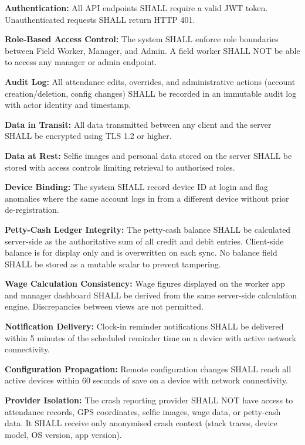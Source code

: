 \documentclass[12pt, a4paper]{article}
\begin{document}
\begin{description}[leftmargin=2.5cm, style=nextline]
    \item[NFR-09]
        \textbf{Authentication:} All API endpoints SHALL require a valid
        JWT token. Unauthenticated requests SHALL return HTTP 401.
    \item[NFR-10]
        \textbf{Role-Based Access Control:} The system SHALL enforce role
        boundaries between Field Worker, Manager, and Admin. A field
        worker SHALL NOT be able to access any manager or admin endpoint.
    \item[NFR-11]
        \textbf{Audit Log:} All attendance edits, overrides, and
        administrative actions (account creation/deletion, config changes)
        SHALL be recorded in an immutable audit log with actor identity
        and timestamp.
    \item[NFR-12]
        \textbf{Data in Transit:} All data transmitted between any client
        and the server SHALL be encrypted using TLS 1.2 or higher.
    \item[NFR-13]
        \textbf{Data at Rest:} Selfie images and personal data stored on
        the server SHALL be stored with access controls limiting retrieval
        to authorised roles.
    \item[NFR-14]
        \textbf{Device Binding:} The system SHALL record device ID at
        login and flag anomalies where the same account logs in from a
        different device without prior de-registration.
    \item[NFR-15]
        \textbf{Petty-Cash Ledger Integrity:} The petty-cash balance
        SHALL be calculated server-side as the authoritative sum of all
        credit and debit entries. Client-side balance is for display only
        and is overwritten on each sync. No balance field SHALL be stored
        as a mutable scalar to prevent tampering.
    \item[NFR-16]
        \textbf{Wage Calculation Consistency:} Wage figures displayed on
        the worker app and manager dashboard SHALL be derived from the
        same server-side calculation engine. Discrepancies between views
        are not permitted.
    \item[NFR-17]
        \textbf{Notification Delivery:} Clock-in reminder notifications
        SHALL be delivered within 5 minutes of the scheduled reminder
        time on a device with active network connectivity.
    \item[NFR-18]
        \textbf{Configuration Propagation:} Remote configuration changes
        SHALL reach all active devices within 60 seconds of save on a
        device with network connectivity.
    \item[NFR-19]
        \textbf{Provider Isolation:} The crash reporting provider SHALL
        NOT have access to attendance records, GPS coordinates, selfie
        images, wage data, or petty-cash data. It SHALL receive only
        anonymised crash context (stack traces, device model, OS version,
        app version).
\end{description}
\end{document}
